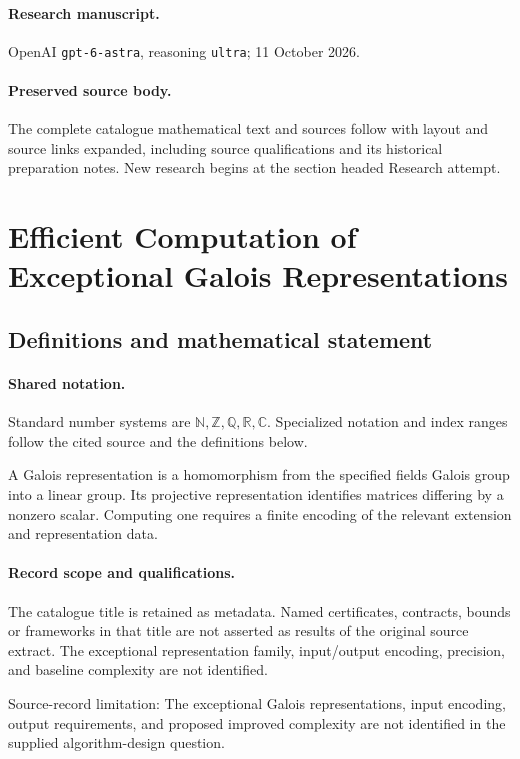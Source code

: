 \documentclass[11pt]{article}
\begin{document}
\paragraph{Research manuscript.} OpenAI \texttt{gpt-6-astra}, reasoning \texttt{ultra}; 11 October 2026.
\paragraph{Preserved source body.} The complete catalogue mathematical text and sources follow with layout and source links expanded, including source qualifications and its historical preparation notes. New research begins at the section headed Research attempt.

\section{Efficient Computation of Exceptional Galois Representations}\label{statement}

\subsection{Definitions and mathematical statement}

\paragraph{Shared notation.}Standard number systems are $\mathbb N,\mathbb Z,\mathbb Q,\mathbb R,\mathbb C$. Specialized notation and index ranges follow the cited source and the definitions below.


A Galois representation is a homomorphism from the specified field\textquotesingle s Galois group into a linear group. Its projective representation identifies matrices differing by a nonzero scalar. Computing one requires a finite encoding of the relevant extension and representation data.
\paragraph{Record scope and qualifications.}
The catalogue title is retained as metadata. Named certificates, contracts, bounds or frameworks in that title are not asserted as results of the original source extract.
The exceptional representation family, input/output encoding, precision, and baseline complexity are not identified.

Source-record limitation: The exceptional Galois representations, input encoding, output requirements, and proposed improved complexity are not identified in the supplied algorithm-design question.
\end{document}
